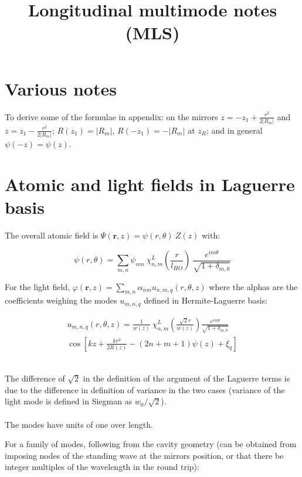 \documentclass[a4paper,twocolumn,nobalancelastpage]{revtex4-1}
\newcommand{\vect}[1]{\mathbf{#1}}
\newcommand{\lho}{l_{HO}}
\begin{document}
\title{Longitudinal multimode notes (MLS)}
\maketitle

\section{Various notes}

To derive some of the formulae in appendix: on the mirrors $z=-z_1+\frac{r^2}{2|R_m|}$ and $z=z_1-\frac{r^2}{2|R_m|}$; $R(z_1)=|R_m|$,  $R(-z_1)=-|R_m|$ at $z_R$; and in general $\psi(-z)=\psi(z)$.

\section{Atomic and light fields in Laguerre basis}

The overall atomic field is $\Psi(\vect{r},z)=\psi(r,\theta) \ Z(z)$ with:

\begin{equation}
\label{eq:LGatoms}
\psi(r, \theta)=\sum_{m,n} \psi_{nm} \  \chi_{n,m}^L\left(\frac{r}{\lho}\right)\ \frac{e^{im\theta}}{\sqrt{1+\delta_{m,0}}}
\end{equation}

For the light field, $\varphi(\vect{r},z)=\sum_{m,n} \alpha_{nm} u_{n,m,q}(r, \theta, z)$ where the alphas are the coefficients weighing the modes $u_{m,n,q}$ defined in Hermite-Laguerre basis:

\begin{multline}
u_{m,n,q}(r,\theta,z)=\frac{1}{w(z)} \ \chi_{n,m}^L  \left(\frac{\sqrt{2}r}{w(z)}\right) \frac{e^{im\theta}}{\sqrt{1+\delta_{m,0}}} \\
  \cos \left[ kz+\frac{kr^2}{2R(z)}-(2n+m+1)\psi(z)+\xi_q \right]
\end{multline}

\\
The difference of $\sqrt{2}$ in the definition of the argument of the Laguerre terms is due to the  difference in definition of variance in the two cases (variance of the light mode is defined in Siegman as $w_0/ \sqrt{2}$).\\
\\
The modes have units of one over length. 

For a family of modes, following from the cavity geometry (can be obtained from imposing nodes of the standing wave at the mirrors position, or that there be integer multiples of the wavelength in the round trip):
\end{document}
